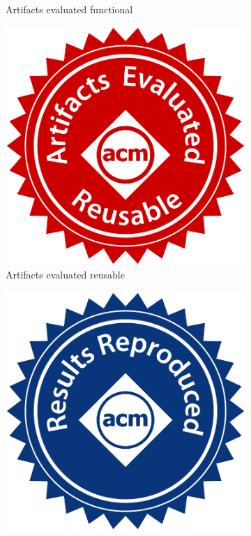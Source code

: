 \documentclass[logo,msc]{infthesis}           %
\begin{document}
\begin{figure}
\begin{subfigure}[t]{0.3\columnwidth}
         \caption{Artifacts evaluated functional}
         \label{fig:three sin x}
     \end{subfigure}
     \hfill
     \begin{subfigure}[t]{0.3\columnwidth}
         \centering
         \includegraphics[width=\textwidth]{assets/artifacts_evaluated_reusable.jpg}
         \caption{Artifacts evaluated reusable}
         \label{fig:five over x}
     \end{subfigure}
    \par\bigskip
     \begin{subfigure}[t]{0.3\columnwidth}
         \centering
         \includegraphics[width=\textwidth]{assets/results_reproduced.jpg}

\end{subfigure}
\end{figure}
\end{document}
